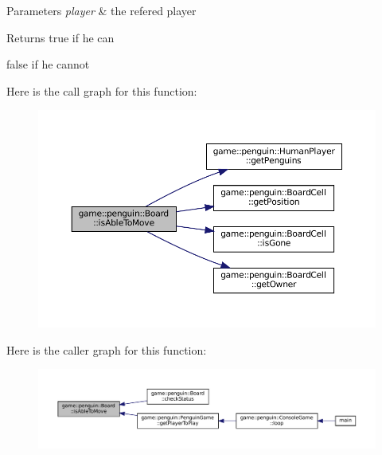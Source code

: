 \begin{DoxyParams}{Parameters}
{\em player} & the refered player \\
\hline
\end{DoxyParams}
\begin{DoxyReturn}{Returns}
true if he can 

false if he cannot 
\end{DoxyReturn}
Here is the call graph for this function\+:
\nopagebreak
\begin{figure}[H]
\begin{center}
\leavevmode
\includegraphics[width=350pt]{classgame_1_1penguin_1_1_board_ae85ef3019829098c5ad5afb1c3ebceb5_cgraph}
\end{center}
\end{figure}
Here is the caller graph for this function\+:
\nopagebreak
\begin{figure}[H]
\begin{center}
\leavevmode
\includegraphics[width=350pt]{classgame_1_1penguin_1_1_board_ae85ef3019829098c5ad5afb1c3ebceb5_icgraph}
\end{center}
\end{figure}
\mbox{\label{classgame_1_1penguin_1_1_board_af297dc572afb02dafc61e3b8e849338f}} 
